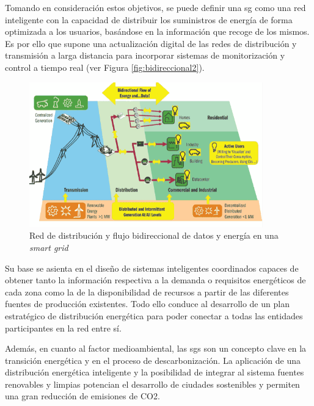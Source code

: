 \vspace{1mm}

Tomando en consideración estos objetivos, se puede definir una \gls{sg} \cite{iotfutura} como una red inteligente con la capacidad de distribuir los suministros de energía de forma optimizada a los usuarios, basándose en la información que recoge de los mismos. Es por ello que supone una actualización digital de las redes de distribución y transmisión a larga distancia para incorporar sistemas de monitorización y control a tiempo real (ver Figura \ref{fig:bidireccional2}).

\vspace{3mm}

\begin{figure}[H]
  \centering
  \includegraphics[width=0.9\textwidth]{img/teoria/sg.png}
  \caption{Red de distribución y flujo bidireccional de datos y energía en una \textit{smart grid} \cite{sins}}
  \label{fig:bidireccional}
\end{figure}

\vspace{3mm}

Su base se asienta en el diseño de sistemas inteligentes coordinados capaces de obtener tanto la información respectiva a la demanda o requisitos energéticos de cada zona como la de la disponibilidad de recursos a partir de las diferentes fuentes de producción existentes. Todo ello conduce al desarrollo de un plan estratégico de distribución energética para poder conectar a todas las entidades participantes en la red entre sí. 

\vspace{3mm}

Además, en cuanto al factor medioambiental, las \gls{sg}s son un concepto clave en la transición energética y en el proceso de descarbonización. La aplicación de una distribución energética inteligente y la posibilidad de integrar al sistema fuentes renovables y limpias potencian el desarrollo de ciudades sostenibles y permiten una gran reducción de emisiones de CO2. \cite{repsol} \cite{iberdrola}


